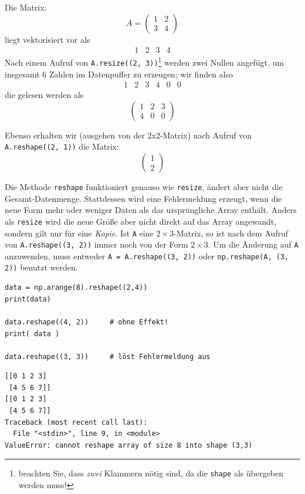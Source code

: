 Die Matrix:
\[ A = \begin{pmatrix}
		1 & 2 \\ 3 & 4
\end{pmatrix} \]
liegt vektorisiert vor als
\[ \begin{matrix}
	1 & 2 & 3 & 4
\end{matrix} \]
Nach einem Aufruf von \texttt{A.resize((2, 3))}\footnote{beachten Sie, dass \emph{zwei} Klammern nötig sind, da die \texttt{shape} als  übergeben werden muss!} werden zwei Nullen angefügt, um insgesamt 6 Zahlen im Datenpuffer zu erzeugen; wir finden also
\[ \begin{matrix}
	 1 & 2 & 3 & 4 & 0 & 0
\end{matrix} \]
die gelesen werden als
\[ \begin{pmatrix}
	1 & 2 & 3 \\ 4 & 0 & 0
\end{pmatrix} \]

Ebenso erhalten wir (ausgehen von der 2x2-Matrix) nach Aufruf von \texttt{A.reshape((2, 1))} die Matrix:
\[ \begin{pmatrix}
	1 \\ 2
\end{pmatrix} \]

Die Methode \texttt{reshape} funktioniert genauso wie \texttt{resize}, ändert aber nicht die Gesamt-Datenmenge. Stattdessen wird eine Fehlermeldung erzeugt, wenn die neue Form mehr oder weniger Daten als das ursprüngliche Array enthält. Anders als \texttt{resize} wird die neue Größe aber nicht direkt auf das Array angewandt, sondern gilt nur für eine \emph{Kopie}. Ist \texttt{A} eine $2 \times 3$-Matrix, so ist nach dem Aufruf von \texttt{A.reshape((3, 2))} immer noch von der Form $2 \times 3$. Um die Änderung auf \texttt{A} anzuwenden, muss entweder \texttt{A = A.reshape((3, 2))} oder \texttt{np.reshape(A, (3, 2))} benutzt werden.

\begin{codebox}
\begin{verbatim}
data = np.arange(8).reshape((2,4))
print(data)

data.reshape((4, 2))     # ohne Effekt!
print( data )

data.reshape((3, 3))     # löst Fehlermeldung aus
\end{verbatim}
\end{codebox}
%
\begin{cmdbox}
\begin{verbatim}
[[0 1 2 3]
 [4 5 6 7]]
[[0 1 2 3]
 [4 5 6 7]]
Traceback (most recent call last):
  File "<stdin>", line 9, in <module>
ValueError: cannot reshape array of size 8 into shape (3,3)
\end{verbatim}
\end{cmdbox}

